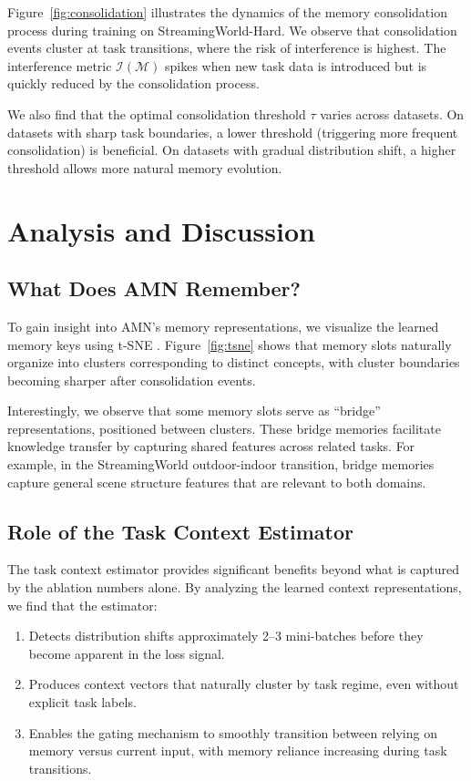 \documentclass[11pt]{article}
\begin{document}
Figure~\ref{fig:consolidation} illustrates the dynamics of the memory consolidation process during training on StreamingWorld-Hard. We observe that consolidation events cluster at task transitions, where the risk of interference is highest. The interference metric $\mathcal{I}(\mathcal{M})$ spikes when new task data is introduced but is quickly reduced by the consolidation process.

We also find that the optimal consolidation threshold $\tau$ varies across datasets. On datasets with sharp task boundaries, a lower threshold (triggering more frequent consolidation) is beneficial. On datasets with gradual distribution shift, a higher threshold allows more natural memory evolution.

\section{Analysis and Discussion}
\label{sec:analysis}

\subsection{What Does AMN Remember?}

To gain insight into AMN's memory representations, we visualize the learned memory keys using t-SNE \citep{maaten2008visualizing}. Figure~\ref{fig:tsne} shows that memory slots naturally organize into clusters corresponding to distinct concepts, with cluster boundaries becoming sharper after consolidation events.

Interestingly, we observe that some memory slots serve as ``bridge'' representations, positioned between clusters. These bridge memories facilitate knowledge transfer by capturing shared features across related tasks. For example, in the StreamingWorld outdoor-indoor transition, bridge memories capture general scene structure features that are relevant to both domains.

\subsection{Role of the Task Context Estimator}

The task context estimator provides significant benefits beyond what is captured by the ablation numbers alone. By analyzing the learned context representations, we find that the estimator:
\begin{enumerate}
    \item Detects distribution shifts approximately 2--3 mini-batches before they become apparent in the loss signal.
    \item Produces context vectors that naturally cluster by task regime, even without explicit task labels.
    \item Enables the gating mechanism to smoothly transition between relying on memory versus current input, with memory reliance increasing during task transitions.
\end{enumerate}
\end{document}
